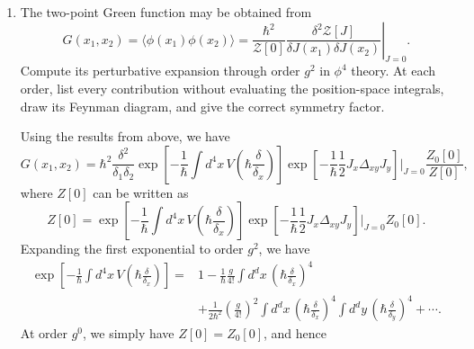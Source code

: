 \begin{enumerate}[label=\alph*)]
    \item The two-point Green function may be obtained from
    \begin{equation}
        G(x_1,x_2)
        =\langle\phi(x_1)\phi(x_2)\rangle
        =\left.
        \frac{\hbar^2}{\mathcal Z[0]}
        \frac{\delta^2\mathcal Z[J]}
             {\delta J(x_1)\delta J(x_2)}
        \right|_{J=0}.
    \end{equation}
    Compute its perturbative expansion through order $g^2$ in $\phi^4$ theory.
    At each order, list every contribution without evaluating the position-space
    integrals, draw its Feynman diagram, and give the correct symmetry factor.
    \begin{solution}
        Using the results from above, we have
        \begin{equation}
            G(x_1,x_2) = \hbar^2\frac{\delta^2}{\delta_1 \delta_2}\exp\!\left[
            -\frac{1}{\hbar}\int d^4x\,
            V\!\left(\hbar\frac{\delta}{\delta_x}\right)
        \right]\exp\left[-\frac{1}{\hbar} \frac{1}{2}J_x\Delta_{xy}J_y\right]\bigg|_{J=0}\frac{Z_0[0]}{Z[0]},
        \end{equation}
        where $Z[0]$ can be written as
        \begin{equation}
            Z[0] = \exp\!\left[
            -\frac{1}{\hbar}\int d^4x\,
            V\!\left(\hbar\frac{\delta}{\delta_x}\right)
        \right]\exp\left[-\frac{1}{\hbar} \frac{1}{2}J_x\Delta_{xy}J_y\right]\bigg|_{J=0}Z_0[0].
        \end{equation}
        Expanding the first exponential to order $g^2$, we have
        \begin{equation}
            \begin{aligned}
                \exp\!\left[-\frac{1}{\hbar}\int d^4x\,
                    V\!\left(\hbar\frac{\delta}{\delta_x}\right)\right]
                ={}&1-\frac{1}{\hbar}\frac{g}{4!}\int d^dx\,
                    \left(\hbar \frac{\delta}{\delta_x}\right)^4\\
                &+\frac{1}{2\hbar^2}\left(\frac{g}{4!}\right)^2
                    \int d^dx\,
                    \left(\hbar \frac{\delta}{\delta_x}\right)^4
                    \int d^dy\,
                    \left(\hbar \frac{\delta}{\delta_y}\right)^4
                    +\cdots.
            \end{aligned}
        \end{equation}
        At order $g^0$, we simply have $Z[0]=Z_0[0]$, and hence
        \begin{equation}

\end{equation}
\end{solution}
\end{enumerate}
